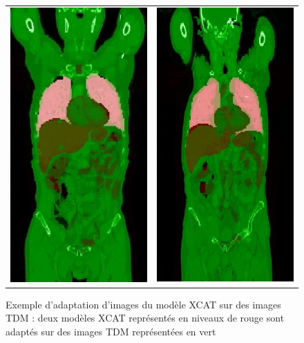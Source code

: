 \begin{figure}
 \centering
 \begin{tabular}{c c}
 \includegraphics[width=6cm]{images/adapt_bru_jea} &
 \includegraphics[width=6cm]{images/adapt_cha_chr}
 \end{tabular}
 \caption[Exemple d’adaptation d’images du modèle XCAT sur des images TDM]{ Exemple d’adaptation d’images du modèle XCAT sur des images TDM : deux modèles XCAT représentés en niveaux de rouge sont adaptés sur des images TDM représentées en vert}
 \label{fig:adaptXCAT}
\end{figure}


